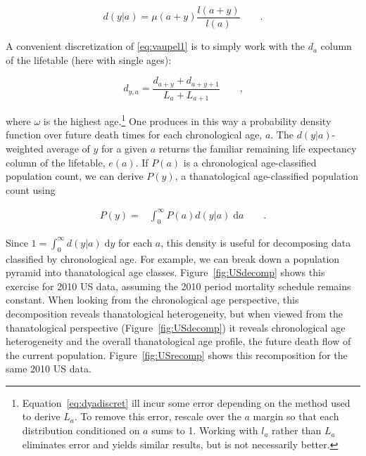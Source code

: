 \documentclass{article}
\newcommand{\dd}{\; \mathrm{d}}
\newcommand{\ec}{\quad\quad\text{,}}
\newcommand{\ep}{\quad\quad\text{.}}
\begin{document}
\begin{equation}
\label{eq:vaupel1}
d(y | a) = \mu(a+y)\frac{l(a+y)}{l(a)} \ep
\end{equation}

A convenient discretization of \eqref{eq:vaupel1} is to simply work with the
$d_a$ column of the lifetable (here with single ages):

\begin{equation}
\label{eq:dyadiscret}
d_{y, a} =  \frac{d_{a+y}+d_{a+y+1}}{L_a + L_{a+1}} \ec
\end{equation}

\noindent where $\omega$ is the highest
age.\footnote{Equation~\eqref{eq:dyadiscret} ill incur some error depending on
the method used to derive $L_a$. To remove this error, rescale over the $a$ margin so that each distribution conditioned on $a$
sums to 1. Working with $l_a$ rather than $L_a$ eliminates error and yields
similar results, but is not necessarily better.} One produces in this way a
probability density function over future death times for each chronological age,
$a$. The $d(y|a)$- weighted average of $y$ for a given $a$ returns the familiar
remaining life expectancy column of the lifetable, $e(a)$. If $P(a)$ is a
chronological age-classified population count, we can derive $P(y)$, a
thanatological age-classified population count using

\begin{align}
\label{eq:transform}
P(y) =& \int_0^\infty P(a) d(y | a) \dd a \ep
\end{align}

Since $1 = \int_0^\infty d(y|a) \dd y$ for each $a$,
this density is useful for decomposing data classified by chronological age. For
example, we can break down a population pyramid into thanatological age classes.
Figure~\ref{fig:USdecomp} shows this exercise for 2010 US data, assuming the
2010 period mortality schedule remains constant. When looking from the
chronological age perspective, this decomposition reveals thanatological
heterogeneity, but when viewed from the thanatological perspective
(Figure~\ref{fig:USdecomp}) it reveals chronological age heterogeneity and the
overall thanatological age profile, the future death flow of the current
population.
Figure~\ref{fig:USrecomp} shows this recomposition for the same 2010
US data.
\end{document}
